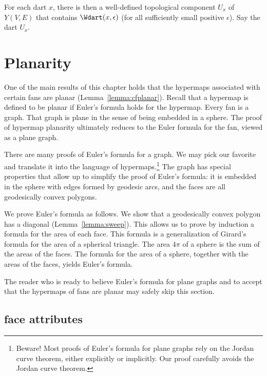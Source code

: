 \begin{definition}
For each dart $x$, 
there is then a well-defined topological
component $U_x$ of $Y(V,E)$ 
that contains $\Wdart(x,\epsilon)$ (for all
sufficiently small positive $\epsilon$). Say the dart 
$U_x$.
\end{definition}
%


\section{Planarity}

One of the main results of this chapter holds that the hypermaps
associated with certain fans are planar (Lemma~\ref{lemma:cfplanar}).
Recall that a hypermap is defined to be planar if Euler's formula
holds for the hypermap.  Every fan is a graph.  That graph is plane in
the sense of being embedded in a sphere.  The proof of hypermap
planarity ultimately reduces to the Euler formula for the fan, viewed
as a plane graph.

There are many proofs of Euler's formula for a graph.  We may pick our
favorite and translate it into the language of
hypermaps.\footnote{Beware!  Most proofs of Euler's formula for plane
  graphs rely on the Jordan curve theorem, either explicitly or
  implicitly.  Our proof carefully avoids the Jordan curve theorem.}
The graph has special properties that allow up to simplify the proof
of Euler's formula: it is embedded in the sphere with edges formed by
geodesic arcs, and the faces are all geodesically convex polygons.

We prove Euler's formula as follows.  We show that a geodesically
convex polygon has a diagonal (Lemma~\ref{lemma:sweep}).  This allows
us to prove by induction a formula for the area of each face. This
formula is a generalization of Girard's formula for the area of a
spherical triangle.  The area $4\pi$ of a sphere is the sum of the
areas of the faces.  The formula for the area of a sphere, together
with the areas of the faces, yields Euler's formula.

The reader who is ready to believe Euler's formula for plane graphs
and to accept that the hypermaps of fans are planar may safely skip
this section.

\subsection{face attributes}

